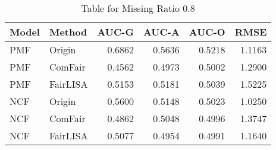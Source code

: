 \begin{table}
\centering
\caption{Table for Missing Ratio 0.8}
\label{tab:missing_0.8}
\begin{tabular}{llrrrr}
\toprule
Model &   Method &  AUC-G &  AUC-A &  AUC-O &   RMSE \\
\midrule
  PMF &   Origin & 0.6862 & 0.5636 & 0.5218 & 1.1163 \\
  PMF &  ComFair & 0.4562 & 0.4973 & 0.5002 & 1.2900 \\
  PMF & FairLISA & 0.5153 & 0.5181 & 0.5039 & 1.5225 \\
  NCF &   Origin & 0.5600 & 0.5148 & 0.5023 & 1.0250 \\
  NCF &  ComFair & 0.4862 & 0.5048 & 0.4996 & 1.3747 \\
  NCF & FairLISA & 0.5077 & 0.4954 & 0.4991 & 1.1640 \\
\bottomrule
\end{tabular}
\end{table}

